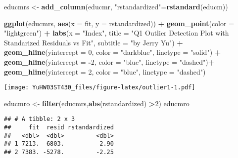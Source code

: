 \documentclass[
]{article}
\newenvironment{Shaded}{\begin{snugshade}}{\end{snugshade}}
\newcommand{\AttributeTok}[1]{\textcolor[rgb]{0.13,0.29,0.53}{#1}}
\newcommand{\DecValTok}[1]{\textcolor[rgb]{0.00,0.00,0.81}{#1}}
\newcommand{\FunctionTok}[1]{\textcolor[rgb]{0.13,0.29,0.53}{\textbf{#1}}}
\newcommand{\NormalTok}[1]{#1}
\newcommand{\OtherTok}[1]{\textcolor[rgb]{0.56,0.35,0.01}{#1}}
\newcommand{\SpecialCharTok}[1]{\textcolor[rgb]{0.81,0.36,0.00}{\textbf{#1}}}
\newcommand{\StringTok}[1]{\textcolor[rgb]{0.31,0.60,0.02}{#1}}
\begin{document}
\begin{Shaded}
\begin{Highlighting}[]
\NormalTok{educmrs }\OtherTok{\textless{}{-}} \FunctionTok{add\_column}\NormalTok{(educmr, }\StringTok{"rstandardized"}\OtherTok{=}\FunctionTok{rstandard}\NormalTok{(educm))}

\FunctionTok{ggplot}\NormalTok{(educmrs, }\FunctionTok{aes}\NormalTok{(}\AttributeTok{x =}\NormalTok{ fit, }\AttributeTok{y =}\NormalTok{ rstandardized)) }\SpecialCharTok{+}
  \FunctionTok{geom\_point}\NormalTok{(}\AttributeTok{color =} \StringTok{"lightgreen"}\NormalTok{) }\SpecialCharTok{+}
  \FunctionTok{labs}\NormalTok{(}\AttributeTok{x =} \StringTok{"Index"}\NormalTok{,}
       \AttributeTok{title =} \StringTok{"Q1 Outlier Detection Plot with Standarized Residuals vs Fit"}\NormalTok{,}
       \AttributeTok{subtitle =} \StringTok{"by Jerry Yu"}\NormalTok{) }\SpecialCharTok{+}
  \FunctionTok{geom\_hline}\NormalTok{(}\AttributeTok{yintercept =} \DecValTok{0}\NormalTok{,}
             \AttributeTok{color =} \StringTok{"darkblue"}\NormalTok{,}
             \AttributeTok{linetype =} \StringTok{"solid"}\NormalTok{) }\SpecialCharTok{+}
    \FunctionTok{geom\_hline}\NormalTok{(}\AttributeTok{yintercept =} \SpecialCharTok{{-}}\DecValTok{2}\NormalTok{,}
             \AttributeTok{color =} \StringTok{"blue"}\NormalTok{,}
             \AttributeTok{linetype =} \StringTok{"dashed"}\NormalTok{)}\SpecialCharTok{+}
  \FunctionTok{geom\_hline}\NormalTok{(}\AttributeTok{yintercept =} \DecValTok{2}\NormalTok{,}
             \AttributeTok{color =} \StringTok{"blue"}\NormalTok{,}
             \AttributeTok{linetype =} \StringTok{"dashed"}\NormalTok{)}
\end{Highlighting}
\end{Shaded}

\texttt{[image: YuHW03ST430\_files/figure-latex/outlier1-1.pdf]}

\begin{Shaded}
\begin{Highlighting}[]
\NormalTok{educmro }\OtherTok{\textless{}{-}} \FunctionTok{filter}\NormalTok{(educmrs,}\FunctionTok{abs}\NormalTok{(rstandardized) }\SpecialCharTok{\textgreater{}}\DecValTok{2}\NormalTok{)}
\NormalTok{educmro}
\end{Highlighting}
\end{Shaded}

\begin{verbatim}
## # A tibble: 2 x 3
##     fit  resid rstandardized
##   <dbl>  <dbl>         <dbl>
## 1 7213.  6803.          2.90
## 2 7383. -5278.         -2.25
\end{verbatim}
\end{document}
